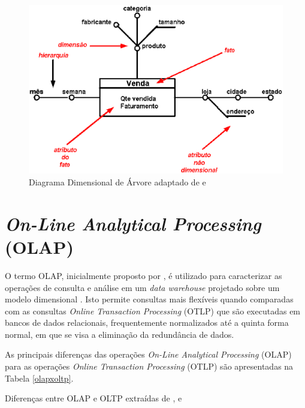 {\begin{figure}[ht!]
\centering
\includegraphics[keepaspectratio=true,scale=0.5]{figuras/arvore.eps}
\caption{Diagrama Dimensional de Árvore adaptado de  e }
\label{fig:tree}
\end{figure}
\FloatBarrier


\section{\textit{On-Line Analytical Processing} (OLAP)}

O termo OLAP, inicialmente proposto por , é utilizado para caracterizar as operações de consulta e análise em um \textit{data warehouse} projetado sobre um modelo dimensional \cite{Kimball2002}. Isto permite consultas mais flexíveis quando comparadas com as consultas \textit{Online Transaction Processing} (OTLP) que são executadas em bancos de dados relacionais, frequentemente normalizados até a quinta forma normal, em que se visa a eliminação da redundância de dados.

As principais diferenças das operações \textit{On-Line Analytical Processing} (OLAP) para as operações 
\textit{Online Transaction Processing} (OTLP) são apresentadas na Tabela 
\ref{olapxoltp}.

	\begin{table}[!ht]
	\begin{center}

	
	
	\caption{Diferenças entre OLAP e OLTP extraídas de ,  e }
	\label{olapxoltp}
	\end{center}
	\end{table}
	\FloatBarrier

}
